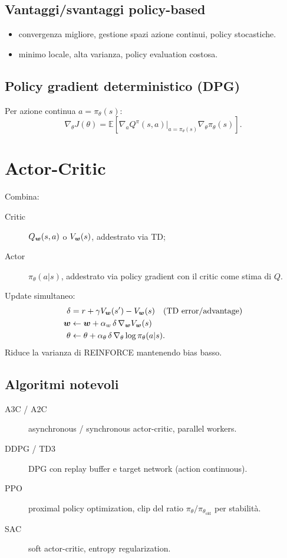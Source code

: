\subsection{Vantaggi/svantaggi policy-based}
\begin{itemize}
  \item[\textbf{Pro:}] convergenza migliore, gestione spazi azione continui, policy stocastiche.
  \item[\textbf{Contro:}] minimo locale, alta varianza, policy evaluation costosa.
\end{itemize}

\subsection{Policy gradient deterministico (DPG)}
Per azione continua $a = \pi_\theta(s)$:
\[
\nabla_\theta J(\theta) = \mathbb{E}\!\left[\nabla_a Q^\pi(s, a)\big|_{a=\pi_\theta(s)} \nabla_\theta \pi_\theta(s)\right].
\]

\section{Actor-Critic}

Combina:
\begin{description}
  \item[Critic] $Q_{\bm{w}}(s,a)$ o $V_{\bm{w}}(s)$, addestrato via TD;
  \item[Actor] $\pi_\theta(a|s)$, addestrato via policy gradient con il critic come stima di $Q$.
\end{description}
Update simultaneo:
\begin{align*}
\delta &= r + \gamma V_{\bm{w}}(s') - V_{\bm{w}}(s) \quad \text{(TD error/advantage)}\\
\bm{w} &\leftarrow \bm{w} + \alpha_w\, \delta\, \nabla_{\bm{w}} V_{\bm{w}}(s)\\
\theta &\leftarrow \theta + \alpha_\theta\, \delta\, \nabla_\theta \log \pi_\theta(a|s).
\end{align*}
Riduce la varianza di REINFORCE mantenendo bias basso.

\subsection{Algoritmi notevoli}
\begin{description}
  \item[A3C / A2C] asynchronous / synchronous actor-critic, parallel workers.
  \item[DDPG / TD3] DPG con replay buffer e target network (action continuous).
  \item[PPO] proximal policy optimization, clip del ratio $\pi_\theta/\pi_{\theta_{\text{old}}}$ per stabilità.
  \item[SAC] soft actor-critic, entropy regularization.
\end{description}

